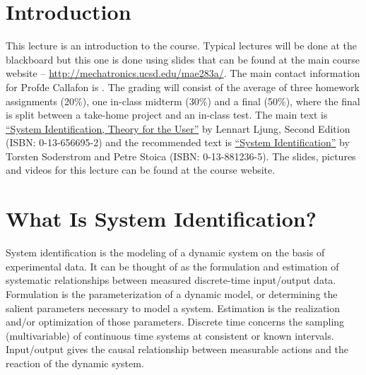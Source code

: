 \mainmatter%
\setcounter{page}{1}

\lectureseries[\course]{\course}

\date{September 24, 2009}

\setaddress%

\setcounter{lecture}{0}
\setcounter{chapter}{0}


\section{Introduction}
This lecture is an introduction to the course.
Typical lectures will be done at the blackboard but this one is done using slides that can be found at the main course website -- \href{http://mechatronics.ucsd.edu/mae283a/}{http://mechatronics.ucsd.edu/mae283a/}.%
The main contact information for Prof\. de Callafon is \mailto{\authEmail}{\authEmail}.
The grading will consist of the average of three homework assignments (20\%), one in-class midterm (30\%) and a final (50\%), where the final is split between a take-home project and an in-class test.
The main text is
\href{http://www.amazon.com/s/ref=nb\_ss?url=search-alias\%3Daps\&field-keywords=0-13-656695-2&x=0\&y=0}
{``System Identification, Theory for the User''} by Lennart Ljung, Second Edition (ISBN: 0-13-656695-2) and the recommended text is%
\href{http://www.amazon.com/s/ref=nb\_ss?url=search-alias\%3Daps\&field-keywords=0-13-881236-5&x=0\&y=0}
{``System Identification''} by Torsten Soderstrom and Petre Stoica (ISBN: 0-13-881236-5).%
The slides, pictures and videos for this lecture can be found at the course website.

\section{What Is System Identification?}
System identification is the modeling of a dynamic system on the basis of experimental data.
It can be thought of as the formulation and estimation of systematic relationships between measured discrete-time input/output data.
Formulation is the parameterization of a dynamic model, or determining the salient parameters necessary to model a system.
Estimation is the realization and/or optimization of those parameters.
Discrete time concerns the sampling (multivariable) of continuous time systems at consistent or known intervals.
Input/output gives the causal relationship between measurable actions and the reaction of the dynamic system.

